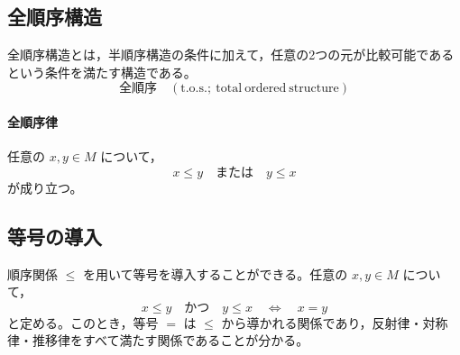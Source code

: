 \documentclass[../main.tex]{subfiles}
\begin{document}
\subsection{全順序構造}

全順序構造とは，半順序構造の条件に加えて，任意の2つの元が比較可能であるという条件を満たす構造である。
\[
  \text{全順序}
  \quad
  (\mathrm{t.o.s.};\ \mathrm{total\ ordered\ structure})
\]

\paragraph{全順序律}
任意の \(x,y \in M\) について，
\[
  x \leq y
  \quad \text{または} \quad
  y \leq x
\]
が成り立つ。

\subsection{等号の導入}

順序関係 \(\leq\) を用いて等号を導入することができる。任意の \(x,y \in M\) について，
\[
  x \leq y
  \quad \text{かつ} \quad
  y \leq x
  \quad \Leftrightarrow \quad
  x = y
\]
と定める。このとき，等号 \(=\) は \(\leq\) から導かれる関係であり，反射律・対称律・推移律をすべて満たす関係であることが分かる。
\end{document}

